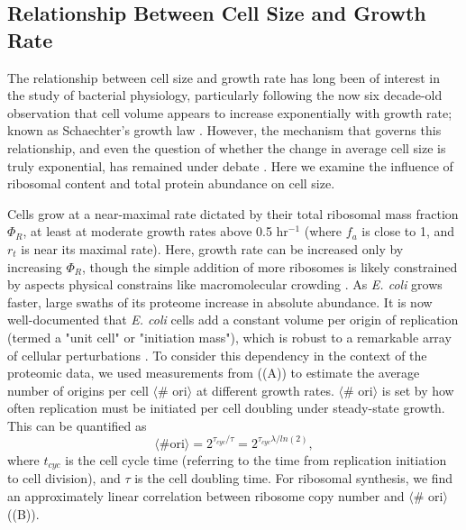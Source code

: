 \subsection{Relationship Between Cell Size and Growth Rate}
The relationship between cell size and growth rate has long been of interest in
the study of bacterial physiology, particularly following the now six decade-old
observation that cell volume appears to increase exponentially with growth rate;
known as Schaechter's growth law \citep{schaechter1958, taheriaraghi2015}.
However, the mechanism that governs this relationship, and even the question of
whether the change in average cell size is truly exponential, has remained under
debate \citep{harris2018}.  Here we examine the influence of ribosomal content
and total protein abundance on cell size.

Cells grow at a near-maximal rate dictated by their total ribosomal mass
fraction $\Phi_R$, at least at moderate growth rates above 0.5 hr$^{-1}$ (where
$f_a$ is close to 1, and $r_t$ is near its maximal rate).  Here, growth rate can
be increased only by increasing $\Phi_R$, though the simple addition of more
ribosomes is likely constrained by aspects physical constrains like
macromolecular crowding \citep{delarue2018, solerbistue2020}. As \textit{E.
coli} grows faster, large swaths of its proteome increase in absolute abundance.
It is now well-documented that \textit{E. coli} cells add a constant volume per
origin of replication (termed a "unit cell" or "initiation mass"), which is
robust to a remarkable array of cellular perturbations \citep{si2017}. To
consider this dependency in the context of the proteomic data, we used
measurements from \cite{si2017} ((A)) to estimate the
average number of origins per cell $\langle$\# ori$\rangle$ at different growth rates.
$\langle$\# ori$\rangle$ is set by how often
replication must be initiated per cell doubling under steady-state growth.
This can be quantified as
\begin{equation}
    \langle \text{\# ori} \rangle = 2^{\tau_{cyc} / \tau} = 2^{\tau_{cyc} \lambda / ln(2)},
    \label{eq:Nori}
\end{equation}
where $t_{cyc}$ is the cell cycle time (referring to the time from replication
initiation to cell division), and $\tau$ is the cell doubling time. For
ribosomal synthesis, we find an approximately linear correlation between
ribosome copy number and $\langle$\# ori$\rangle$
((B)).

